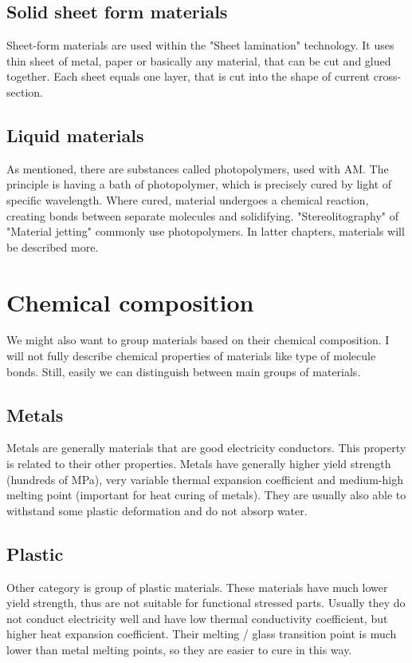 \documentclass[a4paper, twoside, 11pt]{report}
\begin{document}
\subsection{Solid sheet form materials}
Sheet-form materials are used within the "Sheet lamination" technology. It uses thin sheet of metal, paper or basically any material, that can be cut and glued together. Each sheet equals one layer, that is cut into the shape of current cross-section.
\subsection{Liquid materials}
As mentioned, there are substances called photopolymers, used with AM. The principle is having a bath of photopolymer, which is precisely cured by light of specific wavelength. Where cured, material undergoes a chemical reaction, creating bonds between separate molecules and solidifying. "Stereolitography" of "Material jetting" commonly use photopolymers. In latter chapters, materials will be described more.\\
%
%
\section{Chemical composition}
We might also want to group materials based on their chemical composition. I will not fully describe chemical properties of materials like type of molecule bonds. Still, easily we can distinguish between main groups of materials.
\subsection{Metals}
Metals are generally materials that are good electricity conductors. This property is related to their other properties. Metals have generally higher yield strength (hundreds of MPa), very variable thermal expansion coefficient and medium-high melting point (important for heat curing of metals). They are usually also able to withstand some plastic deformation and do not absorp water.
\subsection{Plastic}
Other category is group of plastic materials. These materials have much lower yield strength, thus are not suitable for functional stressed parts. Usually they do not conduct electricity well and have low thermal conductivity coefficient, but higher heat expansion coefficient. Their melting / glass transition point is much lower than metal melting points, so they are easier to cure in this way.
\end{document}
